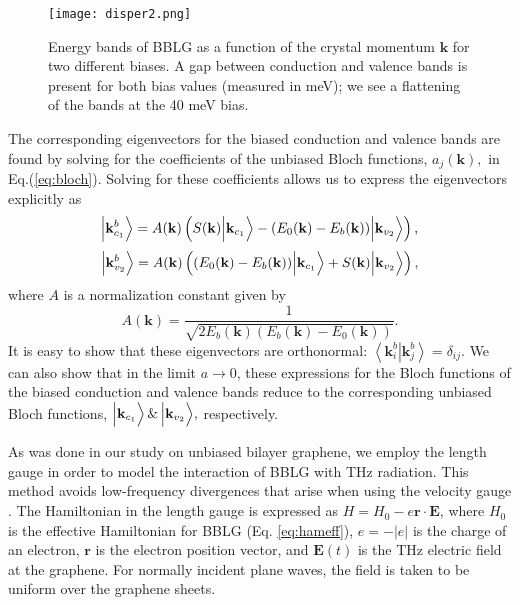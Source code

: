 \documentclass[twocolumn,secnumarabic,amssymb, nobibnotes, aps, prd, superscriptaddress]{revtex4-1}
\begin{document}
\begin{figure}[h]
\centering
\texttt{[image: disper2.png]}
\caption{Energy bands of BBLG as a function of the crystal momentum $\mathbf{k}$ for two different biases. A gap between conduction and valence bands is present for both bias values (measured in meV); we see a flattening of the bands at the 40 meV bias.\label{fig:disper}}
\end{figure}

The corresponding eigenvectors for the biased conduction and valence bands are found by solving for the coefficients of the unbiased Bloch functions, $a_{j}(\mathbf{k}),$ in Eq.(\ref{eq:bloch}). Solving for these coefficients allows us to express the eigenvectors explicitly as
\begin{equation}
\Bigl|\mathbf{k}_{c_{1}}^{b}\Bigr\rangle=A(\mathbf{k})\left(S(\mathbf{k})\Bigl|\mathbf{k}_{c_{1}}\Bigr\rangle-(E_{0}(\mathbf{k})-E_{b}(\mathbf{k}))\Bigl|\mathbf{k}_{v_{2}}\Bigr\rangle\right)\label{eq:con},
\end{equation}
\begin{equation}
\Bigl|\mathbf{k}_{v_{2}}^{b}\Bigr\rangle=A(\mathbf{k})\left((E_{0}(\mathbf{k})-E_{b}(\mathbf{k}))\Bigl|\mathbf{k}_{c_{1}}\Bigr\rangle+S(\mathbf{k})\Bigl|\mathbf{k}_{v_{2}}\Bigr\rangle\right)\label{eq:val},
\end{equation}
where $A$ is a normalization constant given by
\begin{equation}
A(\mathbf{k})=\frac{1}{\sqrt{2E_{b}(\mathbf{k})(E_{b}(\mathbf{k})-E_{0}(\mathbf{k}))}}.
\end{equation}
It is easy to show that these eigenvectors are orthonormal: $\left\langle \mathbf{k}_{i}^{b}\right|\left.\mathbf{k}_{j}^{b}\right\rangle =\delta_{ij}$. We can also show that in the limit $a\rightarrow0$, these expressions for the Bloch functions of the biased conduction and valence bands reduce to the corresponding unbiased Bloch functions, $\Bigl|\mathbf{k}_{c_{1}}\Bigr\rangle\,\&\,\Bigl|\mathbf{k}_{v_{2}}\Bigr\rangle,$ respectively.

As was done in our study on unbiased bilayer graphene, we employ the length gauge in order to model the interaction of BBLG with THz radiation. This method avoids low-frequency divergences that arise when using the velocity gauge \cite{virk2007semiconductor, moss1990band}. The Hamiltonian in the length gauge is expressed as $H=H_{0}-e\mathbf{r}\cdot\mathbf{E}$, where $H_{0}$ is the effective Hamiltonian for BBLG (Eq. \ref{eq:hameff}), $e = -|e|$ is the charge of an electron, $\mathbf{r}$ is the electron position vector, and $\mathbf{E}(t)$ is the THz electric field at the graphene. For normally incident plane waves, the field is taken to be uniform over the graphene sheets.
\end{document}
